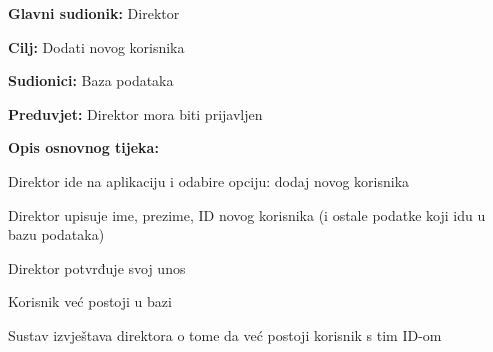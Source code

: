 			\noindent {}
			\begin{packed_item}
				
				\item \textbf{Glavni sudionik: } Direktor
				\item  \textbf{Cilj:} Dodati novog korisnika
				\item  \textbf{Sudionici:} Baza podataka
				\item  \textbf{Preduvjet:} Direktor mora biti prijavljen
				\item  \textbf{Opis osnovnog tijeka:}
				
				\item[] \begin{packed_enum}
					
					\item Direktor ide na aplikaciju i odabire opciju: dodaj novog korisnika
					\item Direktor upisuje ime, prezime, ID novog korisnika (i ostale podatke koji idu u bazu podataka)
					\item Direktor potvrđuje svoj unos
				\end{packed_enum}
				\item[] \begin{packed_item}

					\item[2.a] Korisnik već postoji u bazi
					\item[] \begin{packed_enum}
						
						\item Sustav izvještava direktora o tome da već postoji korisnik s tim ID-om
						
					\end{packed_enum}
					
				\end{packed_item}
			\end{packed_item}
							
